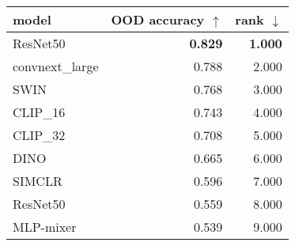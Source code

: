 \begin{tabular}{lrr}
\toprule
          model & OOD accuracy $\uparrow$ & rank $\downarrow$ \\
\midrule
       ResNet50 &          \textbf{0.829} &    \textbf{1.000} \\
convnext\_large &                   0.788 &             2.000 \\
           SWIN &                   0.768 &             3.000 \\
       CLIP\_16 &                   0.743 &             4.000 \\
       CLIP\_32 &                   0.708 &             5.000 \\
           DINO &                   0.665 &             6.000 \\
         SIMCLR &                   0.596 &             7.000 \\
       ResNet50 &                   0.559 &             8.000 \\
      MLP-mixer &                   0.539 &             9.000 \\
\bottomrule
\end{tabular}

